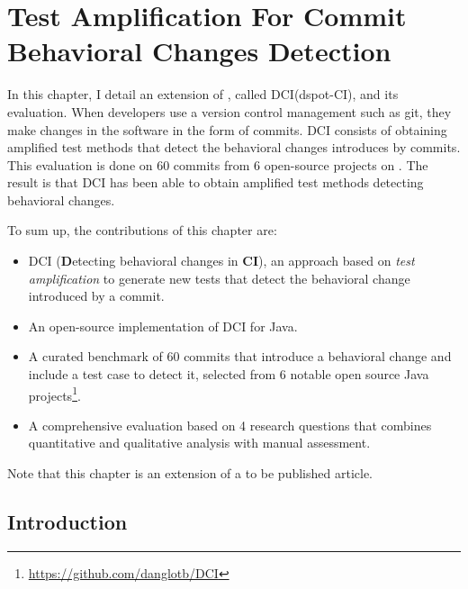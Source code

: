 \chapter{Test Amplification For Commit Behavioral Changes Detection}
\label{chap:dci}


\begin{chaptersummary}
	In this chapter, I detail an extension of \dspot, called DCI(dspot-CI), and its evaluation.
	When developers use a version control management such as git, they make changes in the software in the form of commits.
	DCI consists of obtaining amplified test methods that detect the behavioral changes introduces by commits.
	This evaluation is done on 60 commits from 6 open-source projects on \gh.
	The result is that DCI has been able to obtain amplified test methods detecting  behavioral changes.
	
	To sum up, the contributions of this chapter are:
	\begin{itemize}
		\item DCI (\textbf{D}etecting behavioral changes in \textbf{CI}), an approach based on \emph{test amplification} to generate new tests that detect the behavioral change introduced by a commit.
		\item An open-source implementation of DCI for Java.
		\item A curated benchmark of 60 commits that introduce a behavioral change and include a test case to detect it, selected from 6 notable open source Java projects\footnote{\url{https://github.com/danglotb/DCI}}.
		\item A comprehensive evaluation based on 4 research questions that combines quantitative and qualitative analysis with manual assessment.
	\end{itemize}
	Note that this chapter is an extension of a to be published article\cite{}.
\end{chaptersummary}

\graphicspath{{.}{chapitres/behavioral-change-detection-for-commit/}}

\minitoc

\section{Introduction}
\label{sec:dci:introduction}

